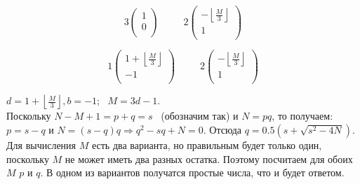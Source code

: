 \documentclass[a4paper,12pt]{article} %
\begin{document}
\[
3\begin{pmatrix}
1\\0\\
\end{pmatrix}\hspace{30pt}
2\begin{pmatrix}
-\left\lfloor\frac{M}{3}\right\rfloor\\1\\
\end{pmatrix}
\]   


\[
1\begin{pmatrix}
1+\left\lfloor\frac{M}{3}\right\rfloor\\-1\\
\end{pmatrix}\hspace{30pt}
2\begin{pmatrix}
-\left\lfloor\frac{M}{3}\right\rfloor\\1\\
\end{pmatrix}
\]   

$d = 1+\left\lfloor\frac{M}{3}\right\rfloor, b = -1;~~~ M=3d-1$. \\

Поскольку $N-M+1=p+q=s$
~(обозначим так) и $N=pq$, то получаем: $p=s-q$ и $N=(s-q)q \Rightarrow q^2-sq+N=0$. Отсюда $q = 0.5(s+\sqrt{s^2-4N})$. Для вычисления $M$ есть два варианта, но правильным будет только один, поскольку $M$ не может иметь два разных остатка. Поэтому посчитаем для обоих $M$ $p$ и $q$. В одном из вариантов получатся простые числа, что и будет ответом.\\
        
\end{document}
